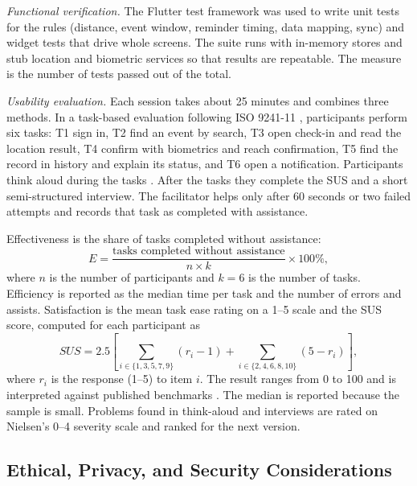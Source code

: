 \documentclass[conference]{IEEEtran}
\begin{document}
\textit{Functional verification.} The Flutter test framework was used to
write unit tests for the rules (distance, event window, reminder timing,
data mapping, sync) and widget tests that drive whole screens. The
suite runs with in-memory stores and stub location and biometric
services so that results are repeatable. The measure is the number of
tests passed out of the total.

\textit{Usability evaluation.} Each session takes about 25 minutes and
combines three methods. In a task-based evaluation following ISO
9241-11 \cite{iso9241_11}, participants perform six tasks: T1 sign in,
T2 find an event by search, T3 open check-in and read the location
result, T4 confirm with biometrics and reach confirmation, T5 find the
record in history and explain its status, and T6 open a notification.
Participants think aloud during the tasks \cite{ericsson1993protocol}.
After the tasks they complete the SUS \cite{brooke1996sus} and a short
semi-structured interview. The facilitator helps only after 60 seconds
or two failed attempts and records that task as completed with
assistance.

Effectiveness is the share of tasks completed without assistance:
\begin{equation}
E = \frac{\text{tasks completed without assistance}}{n \times k}
\times 100\%,
\label{eq:effectiveness}
\end{equation}
where $n$ is the number of participants and $k = 6$ is the number of
tasks. Efficiency is reported as the median time per task and the number
of errors and assists. Satisfaction is the mean task ease rating on a
1--5 scale and the SUS score, computed for each participant as
\begin{equation}
SUS = 2.5\left[\sum_{i\in\{1,3,5,7,9\}}(r_i - 1)
+ \sum_{i\in\{2,4,6,8,10\}}(5 - r_i)\right],
\label{eq:sus}
\end{equation}
where $r_i$ is the response (1--5) to item $i$. The result ranges from 0
to 100 and is interpreted against published benchmarks
\cite{bangor2008sus,sauro2016quantifying}. The median is reported
because the sample is small. Problems found in think-aloud and
interviews are rated on Nielsen's 0--4 severity scale
\cite{nielsen1994severity} and ranked for the next version.

\subsection{Ethical, Privacy, and Security Considerations}
\end{document}
